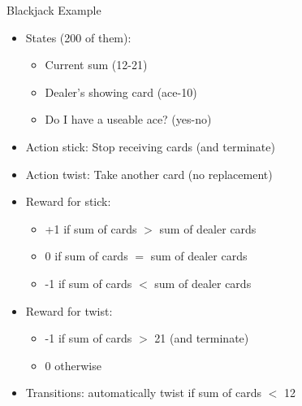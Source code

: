 \bgroup
\begin{frame}{Blackjack Example}
\begin{minipage}{0.7\textwidth}
\begin{itemize}
\item States (200 of them):
\begin{itemize}
\item Current sum (12-21)
\item Dealer's showing card (ace-10)
\item Do I have a useable ace? (yes-no)
\end{itemize}
%
\item Action \textcolor{mImagelabRed}{stick}: Stop receiving cards (and terminate)
\item Action \textcolor{mImagelabRed}{twist}: Take another card (no replacement)
\item Reward for \textcolor{mImagelabRed}{stick}:
\begin{itemize}
\item +1 if sum of cards $>$ sum of dealer cards
\item 0 if sum of cards $=$ sum of dealer cards
\item -1 if sum of cards $<$ sum of dealer cards
\end{itemize}
%
\item Reward for \textcolor{mImagelabRed}{twist}:
\begin{itemize}
\item -1 if sum of cards $>$ 21 (and terminate)
\item 0 otherwise
\end{itemize}
%
\item Transitions: automatically \textcolor{mImagelabRed}{twist} if sum of cards $<$ 12
\end{itemize}
\end{minipage}
\begin{minipage}{0.25\textwidth}
\begin{figure}
\centering

\end{figure}
\end{minipage}
\end{frame}
